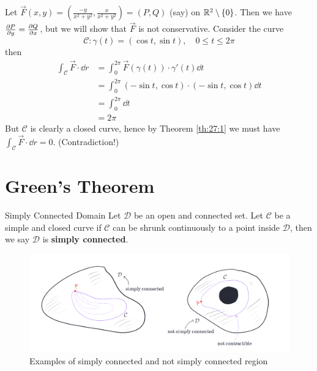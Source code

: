 \documentclass[../Analysis-3.tex]{subfiles}
\begin{document}
\begin{Eg}{}{}
  Let $\vec{F}(x,y) = \left( \frac{-y}{x^2+y^2}, \frac{x}{x^2+y^2} \right) = (P,Q)$ (say) on $\mathbb{R}^2 \setminus \{0\}$. Then we have $\pdv{P}{y} = \pdv{Q}{x}$, but we will show that $\vec{F}$ is not conservative. Consider the curve
  \[
    \mathcal{C} : \gamma(t) = ( \cos t, \sin t), \quad 0 \leq t \leq 2\pi
  \]
  then
  \begin{align*}
    \int_{\mathcal{C}} \vec{F} \cdot \dd r
     & = \int_0^{2\pi}  \vec{F}(\gamma(t))\cdot \gamma'(t)  \dd t       \\
     & = \int_0^{2\pi}  (-\sin t, \cos t) \cdot (-\sin t, \cos t) \dd t \\
     & = \int_0^{2\pi} \dd t                                            \\
     & = 2\pi
  \end{align*}
  But $\mathcal{C}$ is clearly a closed curve, hence by Theorem \ref{th:27:1} we must have $\displaystyle\int_{\mathcal{C}} \vec{F} \cdot \dd r = 0$. (Contradiction!)
\end{Eg}

\section{Green's Theorem}

\begin{Def}{Simply Connected Domain}{}
  Let $\mathcal{D}$ be an open and connected set. Let $\mathcal{C}$ be a simple and closed curve if $\mathcal{C}$ can be shrunk continuously to a point inside $\mathcal{D}$, then we say $\mathcal{D}$ is \textbf{simply connected}.
\end{Def}

\begin{figure}[h]
  \centering
  \includegraphics[width=\textwidth]{../figures/lec27.4.png}
  \caption{Examples of simply connected and not simply connected region}
  \label{fig4:27}
\end{figure}
\end{document}
